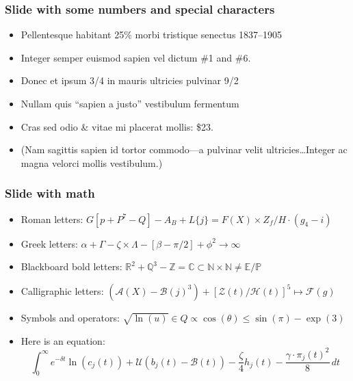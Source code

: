 \documentclass[11pt, xcolor={dvipsnames}, usepdftitle=false]{beamer}
\begin{document}
\begin{frame}
\frametitle{Slide with some numbers and special characters} 
\begin{itemize}
\item Pellentesque habitant 25\% morbi tristique senectus 1837--1905
\item Integer semper euismod sapien vel dictum \#1 and \#6.
\item  Donec et ipsum 3/4 in mauris ultricies pulvinar 9/2
\item Nullam quis ``sapien a justo'' vestibulum fermentum
\item Cras sed odio \& vitae mi placerat mollis: \$23.
\item (Nam sagittis sapien id tortor commodo---a pulvinar velit ultricies\ldots Integer ac magna velorci mollis vestibulum.)
\end{itemize}	
\end{frame}

\begin{frame}
\frametitle{Slide with math}
\begin{itemize}
\item Roman letters: $G[p + P^7-Q] - A_B + L\{j\} = F(X) \times Z_f/H \cdot (g_4 - i)$
\item Greek letters: $\alpha + \Gamma - \zeta \times \Lambda - [\beta - \pi/2] + \phi^2 \to \infty$
\item Blackboard bold letters: $\mathbb{R}^2 + \mathbb{Q}^3 - \mathbb{Z} = \mathbb{C} \subset \mathbb{N} \times \mathbb{N} \neq \mathbb{E} / \mathbb{P}$
\item Calligraphic letters: $(\mathcal{A}(X) - \mathcal{B}(j)^3) + [\mathcal{Z}(t) / \mathcal{H}(t)]^5 \mapsto \mathcal{F}(g) $
\item Symbols and operators: $\sqrt{\ln(u)} \in Q \propto \cos(\theta) \leq \sin(\pi) - \exp(3)$
\item Here is an equation:
\begin{equation*}
\int_{0}^{\infty}e^{-\delta t} \ln(c_{j}(t))+ \mathcal{U}(b_{j}(t) - \mathcal{B}(t))- \frac{\zeta}{4} h_{j}(t) -\frac{\gamma \cdot \pi_{j}(t)^2}{8}\,dt
\end{equation*}
\end{itemize}
\end{frame}
\end{document}
